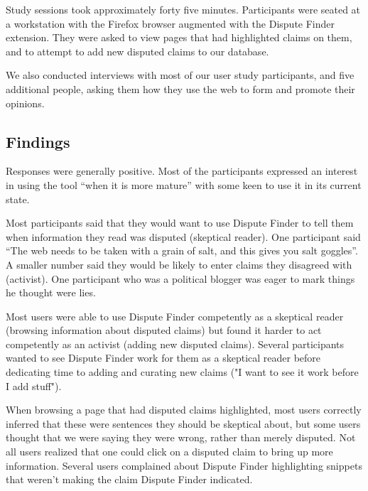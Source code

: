 \documentclass{www2010-submission}
\newcommand{\todo}[1]{}
\begin{document}
Study sessions took approximately forty five minutes. Participants were seated at a workstation with the Firefox browser augmented with the Dispute Finder extension. They were asked to view pages that had highlighted claims on them, and to attempt to add new disputed claims to our database.

We also conducted interviews with most of our user study participants, and five additional people, asking them how they use the web to form and promote their opinions.

\todo{Need to finish the third wave of user studies}

\subsection{Findings}

Responses were generally positive. Most of the participants expressed an interest in using the tool ``when it is more mature'' with some keen to use it in its current state.

\todo{Tye: say how many were keen to use the tool.}

Most participants said that they would want to use Dispute Finder to tell them when information they read was disputed (skeptical reader). One participant said ``The web needs to be taken with a grain of salt, and this gives you salt goggles''. A smaller number said they would be likely to enter claims they disagreed with (activist). One participant who was a political blogger was eager to mark things he thought were lies.

Most users were able to use Dispute Finder competently as a skeptical reader (browsing information about disputed claims) but found it harder to act competently as an activist (adding new disputed claims). Several participants wanted to see Dispute Finder work for them as a skeptical reader before dedicating time to adding and curating new claims ("I want to see it work before I add stuff").

When browsing a page that had disputed claims highlighted, most users correctly inferred that these were sentences they should be skeptical about, but some users thought that we were saying they were wrong, rather than merely disputed. Not all users realized that one could click on a disputed claim to bring up more information. Several users complained about Dispute Finder highlighting snippets that weren't making the claim Dispute Finder indicated.

%
\end{document}
